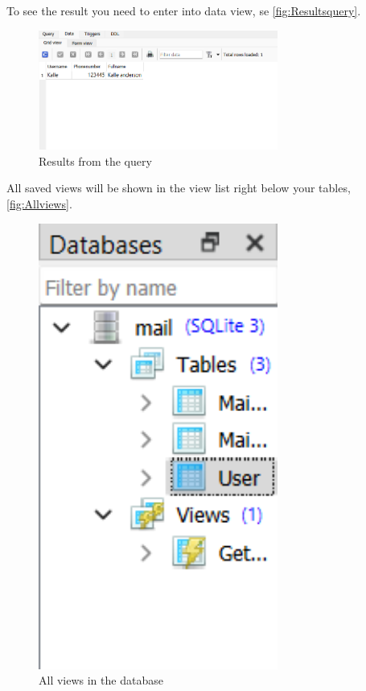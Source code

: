 \documentclass[a4paper,11pt,oneside]{article}
\begin{document}
\begin{sloppypar}
To see the result you need to enter into data view, se \autoref{fig:Resultsquery}.
\begin{figure}[!htb]
  \centering
  \includegraphics[width=0.7\textwidth]{sqlitestudio/queries/create_query_find_results.png}
  \caption{Results from the query} 
  \label{fig:Resultsquery}
\end{figure} 
All saved views will be shown in the view list right below your tables,\autoref{fig:Allviews}.  
\begin{figure}[!htb]
  \centering
  \includegraphics[width=0.7\textwidth]{sqlitestudio/queries/create_query_find_views.png}
  \caption{All views in the database} 
  \label{fig:Allviews}
\end{figure} 


\end{sloppypar}
\end{document}
